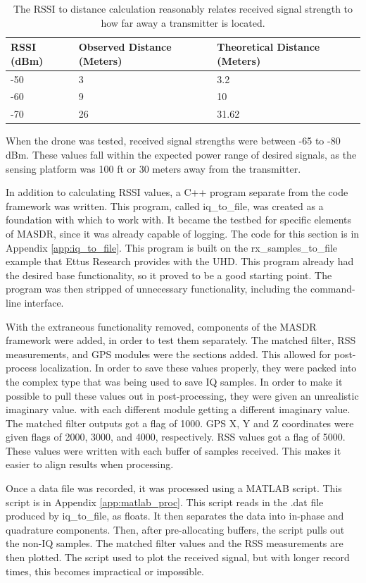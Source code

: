 \begin{table}[ht]
\centering
\caption{The RSSI to distance calculation reasonably relates received signal strength to how far away a transmitter is located.}
\label{table:RSSI_Results}
\begin{tabular}{|l|l|l|} \hline
  RSSI (dBm) & Observed Distance (Meters) & Theoretical Distance (Meters) \\ \hline
  -50 & 3 & 3.2 \\
  -60 & 9 & 10 \\
  -70 & 26 & 31.62 \\ \hline
\end{tabular}
\end{table}\par

When the drone was tested, received signal strengths were between -65 to -80 dBm. These values fall within the expected power range of desired signals, as the sensing platform was 100 ft or 30 meters away from the transmitter. 

In addition to calculating RSSI values, a C++ program separate from the code framework
was written. This program, called iq\_to\_file, was created as a foundation with 
which to work with. It became the testbed for specific elements of MASDR, since it
was already capable of logging. The code for this section is in Appendix \ref{app:iq_to_file}. 
This program is built on the rx\_samples\_to\_file example that Ettus Research provides 
with the UHD. This program already had the desired base functionality, so it proved
to be a good starting point. The program was then stripped of unnecessary functionality,
including the command-line interface. \par
With the extraneous functionality removed, components of the MASDR framework were
added, in order to test them separately. The matched filter, RSS measurements, 
and GPS modules were the sections added. This allowed for post-process localization. In order to 
save these values properly, they were packed into the complex type that was being
used to save IQ samples. In order to make it possible to pull these values out
in post-processing, they were given an unrealistic imaginary value. with each different 
module getting a different imaginary value. The matched filter outputs got 
a flag of 1000. GPS X, Y and Z coordinates were given flags of 2000, 3000, and 4000,
respectively. RSS values got a flag of 5000. These values were written with each 
buffer of samples received. This makes it easier to align results when processing.\par
Once a data file was recorded, it was processed using a MATLAB script. This script 
is in Appendix \ref{app:matlab_proc}. This script reads in the .dat file produced 
by iq\_to\_file, as floats. It then separates the data into in-phase and quadrature
components. Then, after pre-allocating buffers, the script pulls out the non-IQ 
samples. The matched filter values and the RSS measurements are then plotted. The
script used to plot the received signal, but with longer record times, this
becomes impractical or impossible.

